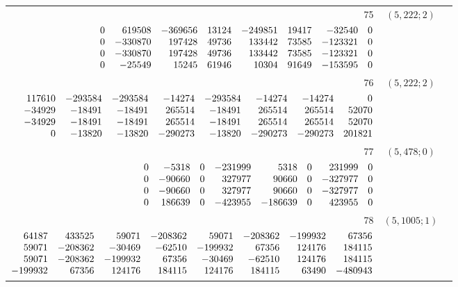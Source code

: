 \documentclass[11pt]{article}
\theoremstyle{remark}
\numberwithin{equation}{section}
\begin{document}
\begin{longtable}{rcl}
75 & $(5,222;2)$ & \begin{tabular}[t]{@{}l@{}}$w_i=\displaystyle \frac{916955097401716893}{50549692936109292447500000000000000}$\\[3pt]{\scriptsize$\begin{array}{@{}rrrrrrrr@{}}0 & 619508 & -369656 & 13124 & -249851 & 19417 & -32540 & 0\\0 & -330870 & 197428 & 49736 & 133442 & 73585 & -123321 & 0\\0 & -330870 & 197428 & 49736 & 133442 & 73585 & -123321 & 0\\0 & -25549 & 15245 & 61946 & 10304 & 91649 & -153595 & 0\end{array}$}\end{tabular}\\[8pt]
76 & $(5,222;2)$ & \begin{tabular}[t]{@{}l@{}}$w_i=\displaystyle \frac{386746425034437}{53675406395459206542968750000000}$\\[3pt]{\scriptsize$\begin{array}{@{}rrrrrrrr@{}}117610 & -293584 & -293584 & -14274 & -293584 & -14274 & -14274 & 0\\-34929 & -18491 & -18491 & 265514 & -18491 & 265514 & 265514 & 52070\\-34929 & -18491 & -18491 & 265514 & -18491 & 265514 & 265514 & 52070\\0 & -13820 & -13820 & -290273 & -13820 & -290273 & -290273 & 201821\end{array}$}\end{tabular}\\[8pt]
77 & $(5,478;0)$ & \begin{tabular}[t]{@{}l@{}}$w_i=\displaystyle \frac{7393629964078759}{110282708584125000000000000000000000}$\\[3pt]{\scriptsize$\begin{array}{@{}rrrrrrrr@{}}0 & -5318 & 0 & -231999 & 5318 & 0 & 231999 & 0\\0 & -90660 & 0 & 327977 & 90660 & 0 & -327977 & 0\\0 & -90660 & 0 & 327977 & 90660 & 0 & -327977 & 0\\0 & 186639 & 0 & -423955 & -186639 & 0 & 423955 & 0\end{array}$}\end{tabular}\\[8pt]
78 & $(5,1005;1)$ & \begin{tabular}[t]{@{}l@{}}$w_i=\displaystyle \frac{716954813220737}{12297880462118565000000000000000000}$\\[3pt]{\scriptsize$\begin{array}{@{}rrrrrrrr@{}}64187 & 433525 & 59071 & -208362 & 59071 & -208362 & -199932 & 67356\\59071 & -208362 & -30469 & -62510 & -199932 & 67356 & 124176 & 184115\\59071 & -208362 & -199932 & 67356 & -30469 & -62510 & 124176 & 184115\\-199932 & 67356 & 124176 & 184115 & 124176 & 184115 & 63490 & -480943\end{array}$}\end{tabular}\\[8pt]

\end{longtable}
\end{document}
